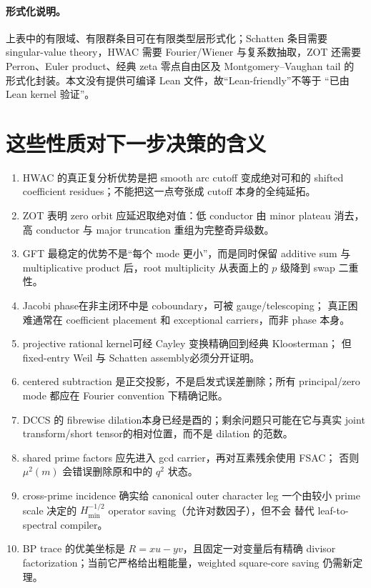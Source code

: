 \documentclass[11pt,a4paper]{ctexart}
\theoremstyle{definition}
\newcommand{\1}{\mathbf 1}
\begin{document}
\paragraph{形式化说明。}
上表中的有限域、有限群条目可在有限类型层形式化；Schatten 条目需要
singular-value theory，HWAC 需要 Fourier/Wiener 与复系数抽取，ZOT 还需要
Perron、Euler product、经典 zeta 零点自由区及 Montgomery--Vaughan tail 的
形式化封装。本文没有提供可编译 Lean 文件，故“Lean-friendly”不等于
“已由 Lean kernel 验证”。

\section{这些性质对下一步决策的含义}

\begin{enumerate}
\item HWAC 的真正复分析优势是把 smooth arc cutoff 变成绝对可和的 shifted
coefficient residues；不能把这一点夸张成 cutoff 本身的全纯延拓。
\item ZOT 表明 zero orbit 应延迟取绝对值：低 conductor 由 minor plateau
消去，高 conductor 与 major truncation 重组为完整奇异级数。
\item GFT 最稳定的优势不是“每个 mode 更小”，而是同时保留 additive sum 与
multiplicative product 后，root multiplicity 从表面上的 $p$ 级降到 swap 二重性。
\item Jacobi phase在非主闭环中是 coboundary，可被 gauge/telescoping；
真正困难通常在 coefficient placement 和 exceptional carriers，而非 phase 本身。
\item projective rational kernel可经 Cayley 变换精确回到经典 Kloosterman；
但 fixed-entry Weil 与 Schatten assembly必须分开证明。
\item centered subtraction 是正交投影，不是启发式误差删除；所有 principal/zero
mode 都应在 Fourier convention 下精确记账。
\item DCCS 的 fibrewise dilation本身已经是酉的；剩余问题只可能在它与真实
joint transform/short tensor的相对位置，而不是 dilation 的范数。
\item shared prime factors 应先进入 gcd carrier，再对互素残余使用 FSAC；
否则 $\mu^2(m)$ 会错误删除原和中的 $q^2$ 状态。
\item cross-prime incidence 确实给 canonical outer character leg 一个由较小
prime scale 决定的 $H_{\min}^{-1/2}$ operator saving（允许对数因子），但不会
替代 leaf-to-spectral compiler。
\item BP trace 的优美坐标是 $R=xu-yv$，且固定一对变量后有精确 divisor
factorization；当前它严格给出粗能量，weighted square-core saving 仍需新定理。
\end{enumerate}
\end{document}
